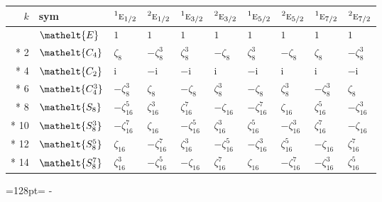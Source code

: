 \documentclass[10pt,a4paper]{article}
\newcommand{\needspace}[1]{\par\penalty-100\begingroup\dimen0=#1\relax\dimen2=\pagegoal
  \advance\dimen2-\pagetotal\ifdim\dimen0>\dimen2\relax\ifdim\dimen2>0pt\vfil\break\fi\fi
  \endgroup}
\numberwithin{equation}{section}
\newcommand{\eltfont}[1]{{\let\sigma\eltsigma\mathelt{#1}}}
\newcommand{\irr}[1]{\text{\normalfont\scshape #1}}
\newcommand{\conjpair}[1]{{}^{#1}}
\newcommand{\cls}[1]{\eltfont{#1}}
\newcommand{\iunit}{\mathrm{i}}
\newcommand{\rootunity}[1]{\zeta_{#1}}
\begin{document}
{\small\setlength{\tabcolsep}{4pt}
\begin{longtable}{@{}rlllllllll@{}}\toprule
$k$ & sym & $\conjpair{1}\irr{e}_{1/2}$ & $\conjpair{2}\irr{e}_{1/2}$ & $\conjpair{1}\irr{e}_{3/2}$ & $\conjpair{2}\irr{e}_{3/2}$ & $\conjpair{1}\irr{e}_{5/2}$ & $\conjpair{2}\irr{e}_{5/2}$ & $\conjpair{1}\irr{e}_{7/2}$ & $\conjpair{2}\irr{e}_{7/2}$\\\midrule\endhead
\bottomrule\endfoot\endlastfoot
0 & $\cls{E}$ & $1$ & $1$ & $1$ & $1$ & $1$ & $1$ & $1$ & $1$\\*
2 & $\cls{C_{4}}$ & $\rootunity{8}$ & $-\rootunity{8}^{3}$ & $\rootunity{8}^{3}$ & $-\rootunity{8}$ & $\rootunity{8}^{3}$ & $-\rootunity{8}$ & $\rootunity{8}$ & $-\rootunity{8}^{3}$\\*
4 & $\cls{C_{2}}$ & $\iunit{}$ & $-\iunit{}$ & $-\iunit{}$ & $\iunit{}$ & $-\iunit{}$ & $\iunit{}$ & $\iunit{}$ & $-\iunit{}$\\*
6 & $\cls{C_{4}^{3}}$ & $-\rootunity{8}^{3}$ & $\rootunity{8}$ & $-\rootunity{8}$ & $\rootunity{8}^{3}$ & $-\rootunity{8}$ & $\rootunity{8}^{3}$ & $-\rootunity{8}^{3}$ & $\rootunity{8}$\\*
8 & $\cls{S_{8}}$ & $-\rootunity{16}^{5}$ & $\rootunity{16}^{3}$ & $\rootunity{16}^{7}$ & $-\rootunity{16}$ & $-\rootunity{16}^{7}$ & $\rootunity{16}$ & $\rootunity{16}^{5}$ & $-\rootunity{16}^{3}$\\*
10 & $\cls{S_{8}^{3}}$ & $-\rootunity{16}^{7}$ & $\rootunity{16}$ & $-\rootunity{16}^{5}$ & $\rootunity{16}^{3}$ & $\rootunity{16}^{5}$ & $-\rootunity{16}^{3}$ & $\rootunity{16}^{7}$ & $-\rootunity{16}$\\*
12 & $\cls{S_{8}^{5}}$ & $\rootunity{16}$ & $-\rootunity{16}^{7}$ & $\rootunity{16}^{3}$ & $-\rootunity{16}^{5}$ & $-\rootunity{16}^{3}$ & $\rootunity{16}^{5}$ & $-\rootunity{16}$ & $\rootunity{16}^{7}$\\*
14 & $\cls{S_{8}^{7}}$ & $\rootunity{16}^{3}$ & $-\rootunity{16}^{5}$ & $-\rootunity{16}$ & $\rootunity{16}^{7}$ & $\rootunity{16}$ & $-\rootunity{16}^{7}$ & $-\rootunity{16}^{3}$ & $\rootunity{16}^{5}$\\
\bottomrule\end{longtable}}
\needspace{128pt}
\end{document}
